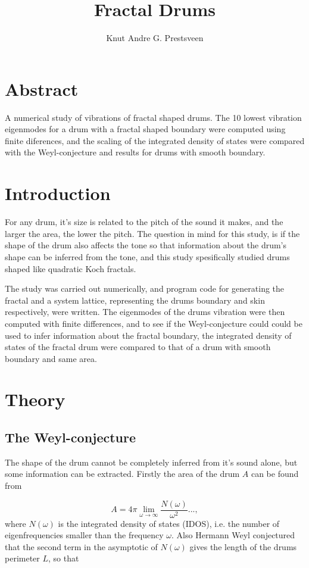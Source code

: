 \documentclass{article}
\title{Fractal Drums}
\author{Knut Andre G. Prestsveen}
\begin{document}
\maketitle


\section{Abstract}
A numerical study of vibrations of fractal shaped drums. The 10 lowest vibration eigenmodes for a drum with a   fractal shaped boundary were computed using finite diferences, and the scaling of the integrated density of states were compared with the Weyl-conjecture and results for drums with smooth boundary.

\section{Introduction}
For any drum, it's size is related to the pitch of the sound it makes, and the larger the area, the lower the pitch. The question in mind for this study, is if the shape of the drum also affects the tone so that information about the drum's shape can be inferred from the tone, and this study spesifically studied drums shaped like quadratic Koch fractals.

The study was carried out numerically, and program code for generating the fractal and a system lattice, representing the drums boundary and skin respectively, were written. The eigenmodes of the drums vibration were then computed with finite differences, and to see if the Weyl-conjecture could could be used to infer information about the fractal boundary, the integrated density of states of the fractal drum were compared to that of a drum with smooth boundary and same area.

\section{Theory}\label{theory}
\subsection{The Weyl-conjecture}
The shape of the drum cannot be completely inferred from it's sound alone, but some information can be extracted. Firstly the area of the drum $A$ can be found from

\begin{equation}
    \label{eq:area}
    A = 4\pi \lim_{\omega \to \infty} \frac{N(\omega)}{\omega^2}... ,
\end{equation}
where $N(\omega)$ is the integrated density of states (IDOS), i.e. the number of eigenfrequencies smaller than the frequency $\omega$. Also Hermann Weyl conjectured that the second term in the asymptotic of $N(\omega)$ gives the length of the drums perimeter $L$, so that
\end{document}
